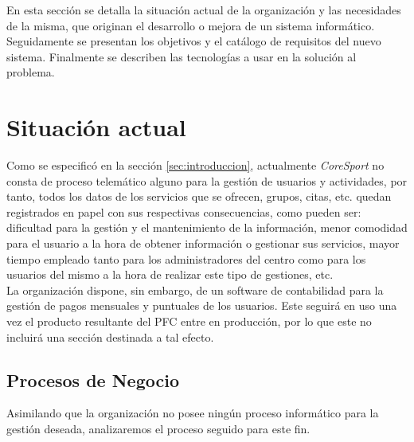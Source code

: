 

En esta sección se detalla la situación actual de la organización y las necesidades de la misma, que originan el desarrollo o mejora de un sistema informático. Seguidamente se presentan los objetivos y el catálogo de requisitos del nuevo sistema. Finalmente se describen las tecnologías a usar en la solución al problema.

\section{Situación actual} 

Como se especificó en la sección \ref{sec:introduccion}, actualmente \textsl{CoreSport} no consta de proceso telemático alguno para la gestión de usuarios y actividades, por tanto, todos los datos de los servicios que se ofrecen, grupos, citas, etc. quedan registrados en papel con sus respectivas consecuencias, como pueden ser: dificultad para la gestión y el mantenimiento de la información, menor comodidad para el usuario a la hora de obtener información o gestionar sus servicios, mayor tiempo empleado tanto para los administradores del centro como para los usuarios del mismo a la hora de realizar este tipo de gestiones, etc.
\\

La organización dispone, sin embargo, de un software de contabilidad para la gestión de pagos mensuales y puntuales de los usuarios. Este seguirá en uso una vez el producto resultante del PFC entre en producción, por lo que este no incluirá una sección destinada a tal efecto.

\subsection{Procesos de Negocio}\label{subsec:procesosnegocios}

Asimilando que la organización no posee ningún proceso informático para la gestión deseada, analizaremos el proceso seguido para este fin. 
\\

